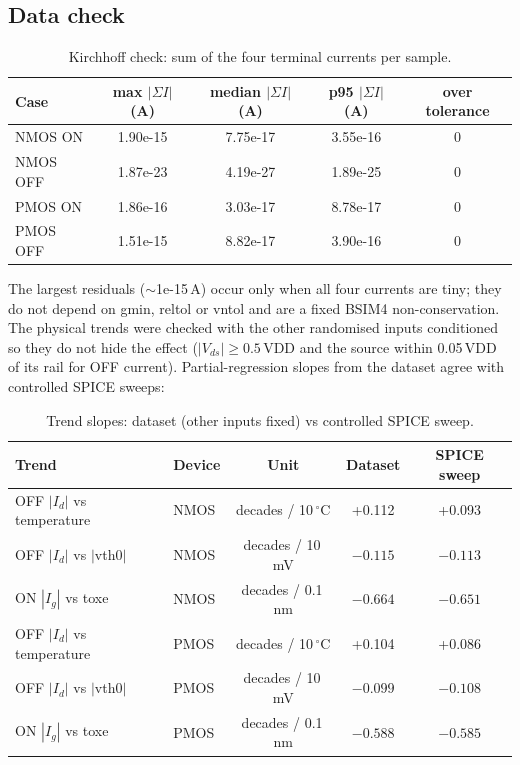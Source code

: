 \documentclass[11pt,a4paper]{article}
\begin{document}
\subsection{Data check}
\begin{table}[H]
\centering
\caption{Kirchhoff check: sum of the four terminal currents per sample.}
\begin{tabular}{lcccc}
\toprule
Case & max $|\Sigma I|$ (A) & median $|\Sigma I|$ (A) & p95 $|\Sigma I|$ (A) & over tolerance \\
\midrule
NMOS ON  & 1.90e-15 & 7.75e-17 & 3.55e-16 & 0 \\
NMOS OFF & 1.87e-23 & 4.19e-27 & 1.89e-25 & 0 \\
PMOS ON  & 1.86e-16 & 3.03e-17 & 8.78e-17 & 0 \\
PMOS OFF & 1.51e-15 & 8.82e-17 & 3.90e-16 & 0 \\
\bottomrule
\end{tabular}
\end{table}

The largest residuals ($\sim$1e-15\,A) occur only when all four currents are tiny; they do not depend on
gmin, reltol or vntol and are a fixed BSIM4 non-conservation. The physical trends were checked with the
other randomised inputs conditioned so they do not hide the effect ($|V_{ds}| \ge 0.5\,$VDD and the source
within 0.05\,VDD of its rail for OFF current). Partial-regression slopes from the dataset agree with
controlled SPICE sweeps:

\begin{table}[H]
\centering
\caption{Trend slopes: dataset (other inputs fixed) vs controlled SPICE sweep.}
\begin{tabular}{llccc}
\toprule
Trend & Device & Unit & Dataset & SPICE sweep \\
\midrule
OFF $|I_d|$ vs temperature & NMOS & decades / 10\,$^\circ$C & +0.112 & +0.093 \\
OFF $|I_d|$ vs $|$vth0$|$ & NMOS & decades / 10\,mV & $-0.115$ & $-0.113$ \\
ON $|I_g|$ vs toxe & NMOS & decades / 0.1\,nm & $-0.664$ & $-0.651$ \\
OFF $|I_d|$ vs temperature & PMOS & decades / 10\,$^\circ$C & +0.104 & +0.086 \\
OFF $|I_d|$ vs $|$vth0$|$ & PMOS & decades / 10\,mV & $-0.099$ & $-0.108$ \\
ON $|I_g|$ vs toxe & PMOS & decades / 0.1\,nm & $-0.588$ & $-0.585$ \\
\bottomrule
\end{tabular}
\end{table}
\end{document}
